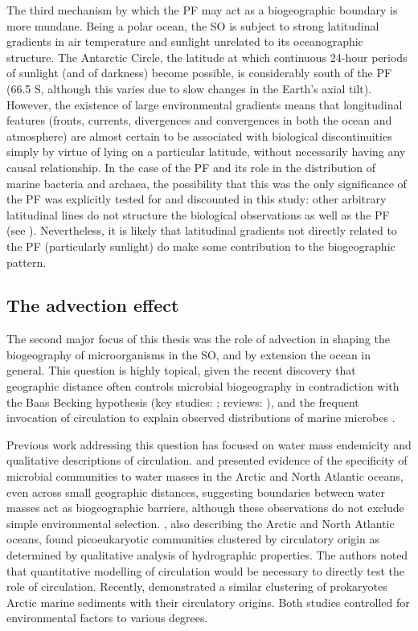The third mechanism by which the \ac{PF} may act as a biogeographic boundary is more mundane.
Being a polar ocean, the \ac{SO} is subject to strong latitudinal gradients in air temperature and sunlight unrelated to its oceanographic structure.
The Antarctic Circle, the latitude at which continuous 24-hour periods of sunlight (and of darkness) become possible, is considerably south of the \ac{PF} (\textapprox{}66.5\textdegree{} S, although this varies due to slow changes in the Earth's axial tilt).
However, the existence of large environmental gradients means that longitudinal features (fronts, currents, divergences and convergences in both the ocean and atmosphere) are almost certain to be associated with biological discontinuities simply by virtue of lying on a particular latitude, without necessarily having any causal relationship.
In the case of the \ac{PF} and its role in the distribution of marine bacteria and archaea, the possibility that this was the only significance of the \ac{PF} was explicitly tested for and discounted in this study: other arbitrary latitudinal lines do not structure the biological observations as well as the \ac{PF} (see ).
Nevertheless, it is likely that latitudinal gradients not directly related to the \ac{PF} (particularly sunlight) do make some contribution to the biogeographic pattern.

\subsection{The advection effect}

The second major focus of this thesis was the role of advection in shaping the biogeography of microorganisms in the \ac{SO}, and by extension the ocean in general.
This question is highly topical, given the recent discovery that geographic distance often controls microbial biogeography in contradiction with the Baas Becking hypothesis (key studies: \citet{Cho:2000tn,Whitaker:2003dz}; reviews: \citet{Martiny:2006jy,Hanson:2012cb}), and the frequent invocation of circulation to explain observed distributions of marine microbes \citep[e.g.][]{Lauro:2007bf,Giebel:2009hr,Ghiglione:2012ei,Sul:2013in}.

Previous work addressing this question has focused on water mass endemicity and qualitative descriptions of circulation.
\citet{Galand:2009hy} and \citet{Agogue:2011fm} presented evidence of the specificity of microbial communities to water masses in the Arctic and North Atlantic oceans, even across small geographic distances, suggesting boundaries between water masses act as biogeographic barriers, although these observations do not exclude simple environmental selection.
\citet{Hamilton:2008tp}, also describing the Arctic and North Atlantic oceans, found picoeukaryotic communities clustered by circulatory origin as determined by qualitative analysis of hydrographic properties.
The authors noted that quantitative modelling of circulation would be necessary to directly test the role of circulation.
Recently, \citet{Hamdan:2013ko} demonstrated a similar clustering of prokaryotes Arctic marine sediments with their circulatory origins.
Both studies controlled for environmental factors to various degrees.

